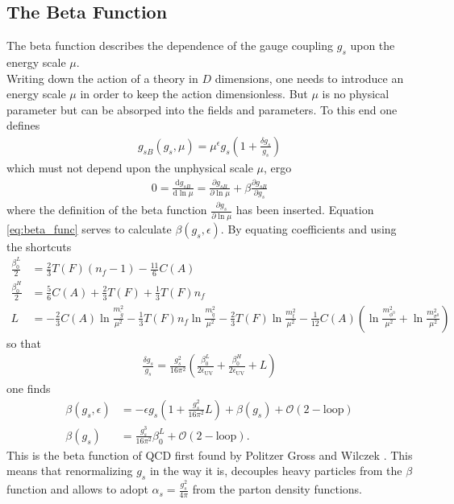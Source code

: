 \subsection{The Beta Function}\label{sec:beta_function}
The beta function describes the dependence of the gauge coupling $g_s$ upon the energy scale $\mu$.\\
Writing down the action of a theory in $D$ dimensions, one needs to introduce an energy scale $\mu$ in order to keep the action dimensionless. But $\mu$ is no physical parameter but can be absorped into the fields and parameters. To this end one defines
\begin{align}
g_{sB}(g_s, \mu) = \mu^\epsilon g_s \left( 1 + \frac{\delta g_s}{g_s} \right)
\end{align}
which must not depend upon the unphysical scale $\mu$, ergo
\begin{align}
0 = \frac{\mathrm{d}g_{sB}}{\mathrm{d}\ln\mu} = \frac{\partial g_{sB}}{\partial \ln\mu} + \beta \frac{\partial g_{sB}}{\partial g_s}\label{eq:beta_func}
\end{align}
where the definition of the beta function $\frac{\partial g_s}{\partial\ln\mu}$ has been inserted. Equation \eqref{eq:beta_func} serves to calculate $\beta(g_s,\epsilon)$.  By equating coefficients and using the shortcuts
\begin{align*}
\frac{\beta_0^L}{2} &= \frac{2}{3}T(F)(n_f-1) - \frac{11}{6}C(A)\\
\frac{\beta_0^H}{2} &= \frac{5}{6}C(A) + \frac{2}{3}T(F) + \frac{1}{3}T(F)n_f\\
L &= - \frac{2}{3} C(A) \ln \frac{m_{\tilde{g}}^2}{\mu^2} - \frac{1}{3}T(F)n_f \ln \frac{m_{\tilde{q}}^2}{\mu^2} - \frac{2}{3}T(F) \ln \frac{m_t^2}{\mu^2}-\frac{1}{12} C(A) \left( \ln \frac{m_{\phi^0}^2}{\mu^2} + \ln \frac{m_{\sigma^0}^2}{\mu^2} \right)
\end{align*}
so that 
\begin{align}
\frac{\delta g_s}{g_s} = \frac{g_s^2}{16\pi^2}\left( \frac{\beta^L_0}{2\epsilon_{\mathrm{UV}}} + \frac{\beta^H_0}{2\epsilon_{\mathrm{UV}}} + L \right)
\end{align}
one finds
\begin{align}
\beta(g_s,\epsilon) &= -\epsilon g_s \left( 1 + \frac{g_s^2}{16\pi^2} L \right) + \beta(g_s) + \mathcal{O}(\mathrm{2-loop})\\
\beta(g_s) &= \frac{g_s^3}{16\pi^2} \beta_0^L + \mathcal{O}(\mathrm{2-loop}).
\end{align}
This is the beta function of QCD first found by Politzer \cite{Politzer:1973fx} Gross and Wilczek \cite{Gross:1973ju}. This means that renormalizing $g_s$ in the way it is, decouples heavy particles from the $\beta$ function and allows to adopt $\alpha_s = \frac{g_s^2}{4\pi}$ from the parton density functions.



